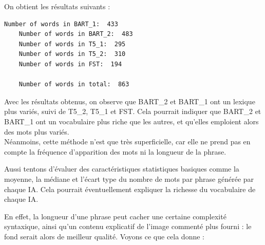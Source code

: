 \documentclass[conference]{IEEEtran}
\begin{document}
On obtient les résultats suivants : 

\vspace{5mm}

\begin{mdframed}
  \begin{lstlisting}[style=terminal]
    Number of words in BART_1:  433
    Number of words in BART_2:  483
    Number of words in T5_1:  295
    Number of words in T5_2:  310
    Number of words in FST:  194

    Number of words in total:  863
  \end{lstlisting}
\end{mdframed}

\vspace{5mm}

Avec les résultats obtenus, on observe que BART\_2 et BART\_1 ont un lexique plus variés, suivi de T5\_2, T5\_1 et FST. Cela pourrait indiquer que BART\_2 et BART\_1 ont un vocabulaire plus riche que les autres, et qu'elles emploient alors des mots plus variés.\\

Néanmoins, cette méthode n'est que très superficielle, car elle ne prend pas en compte la fréquence d'apparition des mots ni la longueur de la phrase.

Aussi tentons d'évaluer des caractéristiques statistiques basiques comme la moyenne, la médiane et l'écart type du nombre de mots par phrase générée par chaque IA. Cela pourrait éventuellement expliquer la richesse du vocabulaire de chaque IA.

En effet, la longueur d'une phrase peut cacher une certaine complexité syntaxique, ainsi qu'un contenu explicatif de l'image commenté plus fourni : le fond serait alors de meilleur qualité. Voyons ce que cela donne : 

\vspace{5mm}

\end{document}
